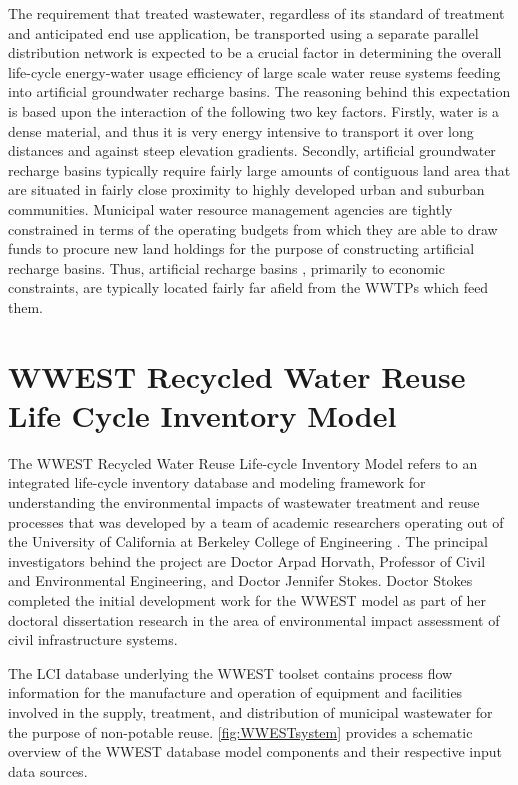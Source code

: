 The requirement that treated wastewater, regardless of its standard of treatment and anticipated end use application, be transported using a separate parallel distribution network is expected to be a crucial factor in determining the overall life-cycle energy-water usage efficiency of large scale water reuse systems feeding into artificial groundwater recharge basins. The reasoning behind this expectation is based upon the interaction of the following two key factors. Firstly,  water is a dense material, and thus it is very energy intensive to transport it over long distances and against steep elevation gradients. Secondly, artificial groundwater recharge basins typically require fairly large amounts of contiguous land area that are situated in fairly close proximity to highly developed urban and suburban communities. Municipal water resource management agencies are tightly constrained in terms of the operating budgets from which they are able to draw funds to procure new land holdings for the purpose of constructing artificial recharge basins. Thus, artificial recharge basins , primarily to economic constraints, are typically located fairly far afield from the WWTPs which feed them.
 
\section{WWEST Recycled Water Reuse Life Cycle Inventory Model}

The WWEST Recycled Water Reuse Life-cycle Inventory Model refers to an integrated life-cycle inventory database and modeling framework for understanding the environmental impacts of wastewater treatment and reuse processes that was developed by a team of academic researchers operating out of the University of California at Berkeley College of Engineering \cite{Stokes2010}. The principal investigators behind the project are Doctor Arpad Horvath, Professor of Civil and Environmental Engineering, and Doctor Jennifer Stokes. Doctor Stokes completed the initial development work for the WWEST model as part of her doctoral dissertation research in the area of environmental impact assessment of civil infrastructure systems.

The LCI database underlying the WWEST toolset contains process flow information for the manufacture and operation of equipment and facilities involved in the supply, treatment, and distribution of municipal wastewater for the purpose of non-potable reuse. \ref{fig:WWESTsystem} 
provides a schematic overview of the WWEST database model components and their respective input data sources.

